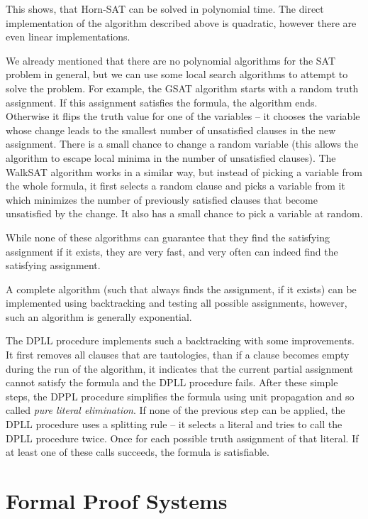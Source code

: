 This shows, that Horn-SAT can be solved in polynomial time. The direct implementation of the algorithm described above is quadratic, however there are even linear implementations.

We already mentioned that there are no polynomial algorithms for the SAT problem in general, but we can use some local search algorithms to attempt to solve the problem. For example, the GSAT algorithm starts with a random truth assignment. If this assignment satisfies the formula, the algorithm ends. Otherwise it flips the truth value for one of the variables -- it chooses the variable whose change leads to the smallest number of unsatisfied clauses in the new assignment. There is a small chance to change a random variable (this allows the algorithm to escape local minima in the number of unsatisfied clauses). The WalkSAT algorithm works in a similar way, but instead of picking a variable from the whole formula, it first selects a random clause and picks a variable from it which minimizes the number of previously satisfied clauses that become unsatisfied by the change. It also has a small chance to pick a variable at random. 

While none of these algorithms can guarantee that they find the satisfying assignment if it exists, they are very fast, and very often can indeed find the satisfying assignment.

A complete algorithm (such that always finds the assignment, if it exists) can be implemented using backtracking and testing all possible assignments, however, such an algorithm is generally exponential. 

The DPLL procedure implements such a backtracking with some improvements. It first removes all clauses that are tautologies, than if a clause becomes empty during the run of the algorithm, it indicates that the current partial assignment cannot satisfy the formula and the DPLL procedure fails. After these simple steps, the DPPL procedure simplifies the formula using unit propagation and so called \emph{pure literal elimination}. If none of the previous step can be applied, the DPLL procedure uses a splitting rule -- it selects a literal and tries to call the DPLL procedure twice. Once for each possible truth assignment of that literal. If at least one of these calls succeeds, the formula is satisfiable.

\chapter{Formal Proof Systems}

